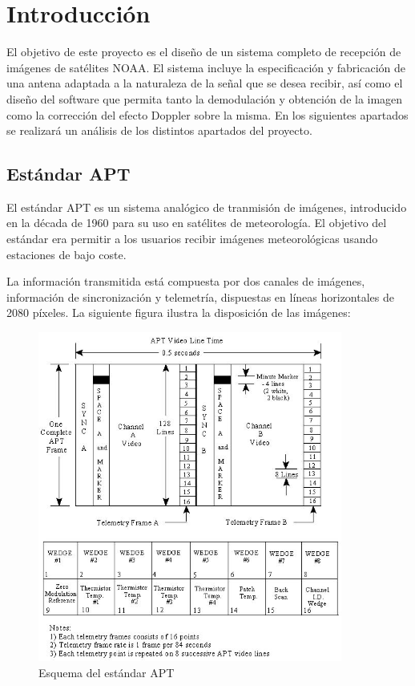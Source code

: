 \documentclass[a4paper,openright,12pt]{article}
\begin{document}


\tableofcontents
\newpage

\section{Introducción}

	El objetivo 	de este proyecto es el diseño de un sistema completo de recepción de imágenes de satélites NOAA. El sistema incluye la especificación y fabricación de una antena adaptada a la naturaleza de la señal que se desea recibir, así como el diseño del software que permita tanto la demodulación y obtención de la imagen como la corrección del efecto Doppler sobre la misma. En los siguientes apartados se realizará un análisis de los distintos apartados del proyecto.
	
	\subsection{Estándar APT}
	
	El estándar APT es un sistema analógico de tranmisión de imágenes, introducido en la década de 1960 para su uso en satélites de meteorología. El objetivo del estándar era permitir a los usuarios recibir imágenes meteorológicas usando estaciones de bajo coste. 
	
	La información transmitida está compuesta por dos canales de imágenes, información de sincronización y telemetría, dispuestas en líneas horizontales de 2080 píxeles. La siguiente figura ilustra la disposición de las imágenes:
	
	\begin{figure}[hbtp]
 \centering
 \includegraphics[width = 10cm]{imagenes/APT_frame.JPG}
 \caption{Esquema del estándar APT}
 \label{APT_FRAME}
 \end{figure}
\end{document}
